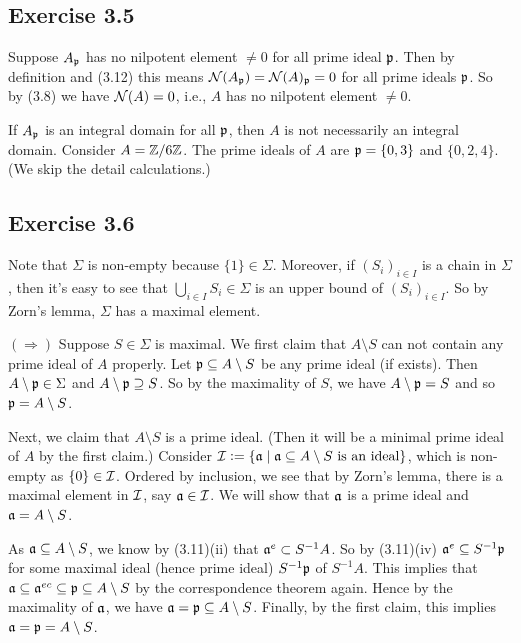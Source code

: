 \documentclass[../A&M.tex]{subfiles}
\begin{document}
\subsection*{Exercise 3.5}

Suppose $A_{\mathfrak{p}}$ has no nilpotent element $\neq0$ for all prime ideal $\mathfrak{p}$. Then by definition and (3.12) this means $\mathcal{N}(A_{\mathfrak{p}}) = \mathcal{N}(A)_{\mathfrak{p}} = 0$ for all prime ideals $\mathfrak{p}$. So by (3.8) we have $\mathcal{N}(A)=0$, i.e., $A$ has no nilpotent element $\neq0$.

If $A_{\mathfrak{p}}$ is an integral domain for all $\mathfrak{p}$, then $A$ is not necessarily an integral domain. Consider $A=\mathbb{Z}/6\mathbb{Z}$. The prime ideals of $A$ are $\mathfrak{p} = \{0,3\}$ and $\{0,2,4\}$. (We skip the detail calculations.)

\subsection*{Exercise 3.6}

Note that $\Sigma$ is non-empty because $\{1\} \in \Sigma$. Moreover, if $(S_i)_{i\in I}$ is a chain in $\Sigma$, then it's easy to see that $\bigcup_{i\in I} S_i \in \Sigma$ is an upper bound of $(S_i)_{i\in I}$. So by Zorn's lemma, $\Sigma$ has a maximal element.

$(\Rightarrow)$ Suppose $S \in \Sigma$ is maximal. We first claim that $A\setminus S$ can not contain any prime ideal of $A$ properly. Let $\mathfrak{p} \subseteq A \setminus S$ be any prime ideal (if exists). Then $A \setminus \mathfrak{p} \in \Sigma$ and $A \setminus \mathfrak{p} \supseteq S$. So by the maximality of $S$, we have $A \setminus \mathfrak{p} = S$ and so $\mathfrak{p} = A \setminus S$.

Next, we claim that $A\setminus S$ is a prime ideal. (Then it will be a minimal prime ideal of $A$ by the first claim.) Consider $\mathcal{I}:=\{\mathfrak{a} \mid \mathfrak{a} \subseteq A\setminus S \text{ is an ideal}\}$, which is non-empty as $\{0\} \in \mathcal{I}$. Ordered by inclusion, we see that by Zorn's lemma, there is a maximal element in $\mathcal{I}$, say $\mathfrak{a} \in\mathcal{I}$. We will show that $\mathfrak{a}$ is a prime ideal and $\mathfrak{a} =A\setminus S$.

As $\mathfrak{a} \subseteq A\setminus S$, we know by (3.11)(ii) that $\mathfrak{a}^e \subset S^{-1}A$. So by (3.11)(iv) $\mathfrak{a}^e \subseteq S^{-1}\mathfrak{p}$ for some maximal ideal (hence prime ideal) $S^{-1}\mathfrak{p}$ of $S^{-1}A$. This implies that $\mathfrak{a} \subseteq \mathfrak{a}^{ec} \subseteq \mathfrak{p} \subseteq A\setminus S$ by the correspondence theorem again. Hence by the maximality of $\mathfrak{a}$, we have $\mathfrak{a} = \mathfrak{p} \subseteq A\setminus S$. Finally, by the first claim, this implies $\mathfrak{a} = \mathfrak{p} = A\setminus S$.
\end{document}
